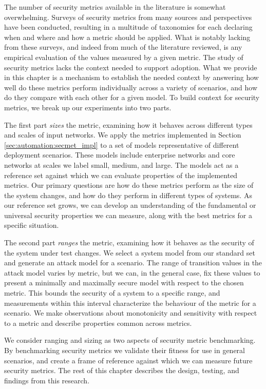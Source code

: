 

The number of security metrics available in the literature is somewhat overwhelming. Surveys of security metrics from many\cite{Bohme_Nowey_2008, Haque_Keffeler_Atkison_2017, Hecker_2008, Kordy_2013, Kundu_Ghosh_Chokshi_Ghosh_2012, Pendleton_Garcia-Lebron_Cho_Xu_2016, Ramos_Lazar_Filho_Rodrigues_2017, Rudolph_Schwarz_2012, Savola_2007, Tavallaee_Stakhanova_Ghorbani_2010, Verendel_2009,  Wagner_Eckhoff_2015} sources and perspectives have been conducted, resulting in a multitude of taxonomies for each declaring when and where and how a metric should be applied.  What is notably lacking from these surveys, and indeed from much of the literature reviewed, is any empirical evaluation of the values measured by a given metric. The study of security metrics lacks the context needed to support adoption. What we provide in this chapter is a mechanism to establish the needed context by answering how well do these metrics perform individually across a variety of scenarios, and how do they compare with each other for a given model. To build context for security metrics, we break up our experiments into two parts. 

The first part \textit{sizes} the metric, examining how it behaves across different types and scales of input networks. We apply the metrics implemented in Section \ref{sec:automation:secmet_impl} to a set of models representative of different deployment scenarios. These models include enterprise networks and core networks at scales we label small, medium, and large. The models  act as a reference set against which we can evaluate properties of the implemented metrics. Our primary questions are how do these metrics perform as the size of the system changes, and how do they perform in different types of systems. As our reference set grows, we can develop an understanding of the fundamental or universal security properties we can measure, along with the best metrics for a specific situation. 

The second part \textit{ranges} the metric, examining how it behaves as the security of the system under test changes. We select a system model from our standard set and generate an attack model for a scenario. The range of transition values in the attack model varies by metric, but we can, in the general case, fix these values to present a minimally and maximally secure model with respect to the chosen metric. This bounds the security of a system to a specific range, and measurements within this interval characterize the behaviour of the metric for a scenario. We make observations about monotonicity and sensitivity with respect to a metric and describe properties common across metrics. 

We consider ranging and sizing as two aspects of security metric benchmarking. By benchmarking security metrics we validate their fitness for use in general scenarios, and create a frame of reference against which we can measure future security metrics. The rest of this chapter describes the design, testing, and findings from this research. 